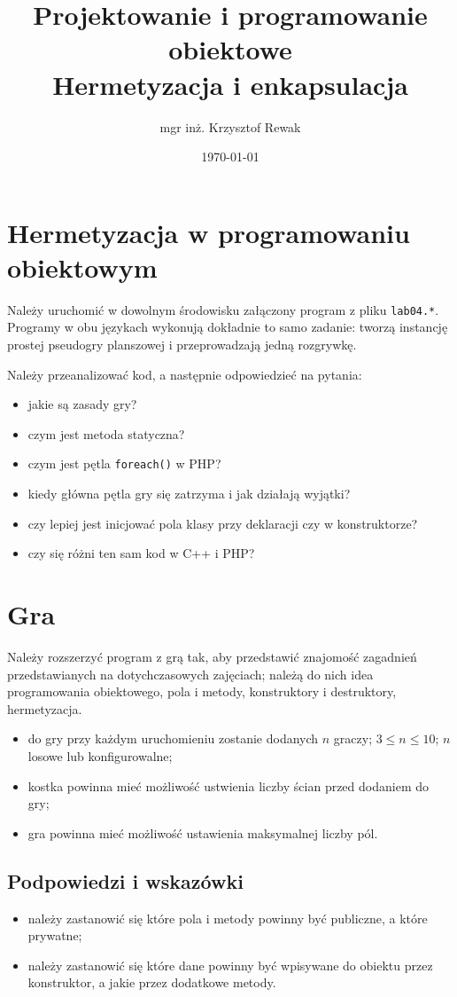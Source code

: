 \documentclass{article}
\title{
	Projektowanie i programowanie obiektowe \\
	\Huge{Hermetyzacja i enkapsulacja}
}
\author{mgr inż. Krzysztof Rewak}
\date{\today}
\begin{document}
	\maketitle

	\section{Hermetyzacja w programowaniu obiektowym}	
	Należy uruchomić w dowolnym środowisku załączony program z pliku \texttt{lab04.*}. Programy w obu językach wykonują dokładnie to samo zadanie: tworzą instancję prostej pseudogry planszowej i przeprowadzają jedną rozgrywkę.
	
	Należy przeanalizować kod, a następnie odpowiedzieć na pytania:
	\begin{itemize}
		\item jakie są zasady gry?
		\item czym jest metoda statyczna?
		\item czym jest pętla \texttt{foreach()} w PHP?
		\item kiedy główna pętla gry się zatrzyma i jak działają wyjątki?
		\item czy lepiej jest inicjować pola klasy przy deklaracji czy w konstruktorze?
		\item czy się różni ten sam kod w C++ i PHP?
	\end{itemize}

	\section{Gra}
	Należy rozszerzyć program z grą tak, aby przedstawić znajomość zagadnień przedstawianych na dotychczasowych zajęciach; należą do nich idea programowania obiektowego, pola i metody, konstruktory i destruktory, hermetyzacja.
	\begin{itemize}
		\item do gry przy każdym uruchomieniu zostanie dodanych $n$ graczy; $3 \leq n \leq 10$; $n$ losowe lub konfigurowalne;
		\item kostka powinna mieć możliwość ustwienia liczby ścian przed dodaniem do gry;
		\item gra powinna mieć możliwość ustawienia maksymalnej liczby pól.
	\end{itemize}

	\subsection{Podpowiedzi i wskazówki}
	\begin{itemize}
		\item należy zastanowić się które pola i metody powinny być publiczne, a które prywatne;
		\item należy zastanowić się które dane powinny być wpisywane do obiektu przez konstruktor, a jakie przez dodatkowe metody.
	\end{itemize}
\end{document}

